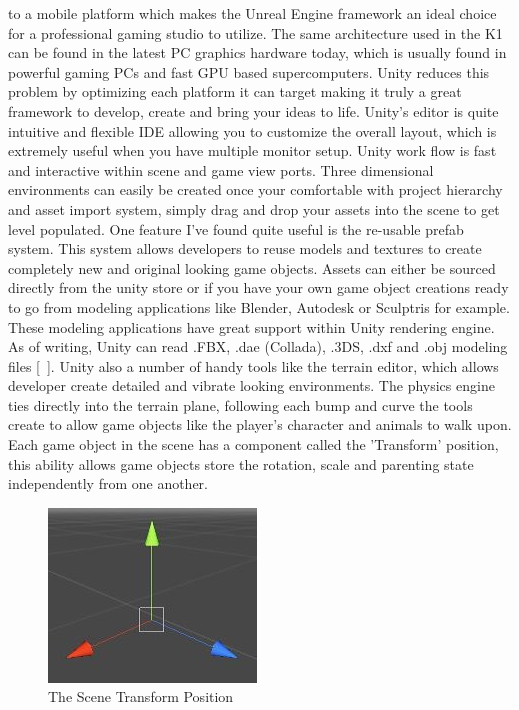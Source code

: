 to a mobile platform which makes the Unreal Engine framework an ideal choice for a professional gaming studio to utilize. The same architecture used in the K1 can be found in the latest PC graphics hardware today, which is usually found in powerful gaming PCs and fast GPU based supercomputers. Unity reduces this problem by optimizing each platform it can target making it truly a great framework to develop, create and bring your ideas to life.
Unity's editor is quite intuitive and flexible IDE allowing you to customize the overall layout, which is extremely useful when you have multiple monitor setup. Unity work flow is fast and interactive within scene and game view ports. Three dimensional environments can easily be created once your comfortable with project hierarchy and asset import system, simply drag and drop your assets into the scene to get level populated. One feature I've found quite useful is the re-usable prefab system. This system allows developers to reuse models and textures to create completely new and original looking game objects. Assets can either be sourced directly from the unity store or if you have your own game object creations ready to go from modeling applications like Blender, Autodesk or Sculptris for example. These modeling applications have great support within Unity rendering engine. As of writing, Unity can read .FBX, .dae (Collada), .3DS, .dxf and .obj modeling files [~\cite{Unity-Models-Support}]. Unity also a number of handy tools like the terrain editor, which allows developer create detailed and vibrate looking environments. The physics engine ties directly into the terrain plane, following each bump and curve the tools create to allow game objects like the player's character and animals to walk upon. Each game object in the scene has a component called the 'Transform' position, this ability allows game objects store the rotation, scale and parenting state independently from one another. 

\begin{figure}[!ht]
	\caption{The Scene Transform Position}
	\centering
	\includegraphics{img/transform.jpg}
\end{figure}

